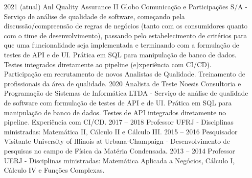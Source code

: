 \documentclass[9pt]{developercv} %
\begin{document}
\begin{entrylist}
	\entry
	{2021 (atual)}%
	{Anl Quality Assurance II}
	{Globo Comunicação e Participações S/A}
	{- Serviço de análise de qualidade de software, começando pela discussão/compreensão de regras de negócios (tanto com os consumidores quanto com o time de desenvolvimento), passando pelo estabelecimento de critérios para que uma funcionalidade seja implementada e terminando com a formulação de testes de API e de UI. Prática em SQL para manipulação de banco de dados. Testes integrados diretamente ao pipeline (e)xperiência com CI/CD). Participação em recrutamento de novos Analistas de Qualidade. Treinamento de profissionais da área de qualidade.}
	\entry
	{2020}%
	{Analista de Teste}
	{Noesis Consultoria e Programação de Sistemas de Informática LTDA}
	{- Serviço de análise de qualidade de software com formulação de testes de API e de UI. Prática em SQL para manipulação de banco de dados. Testes de API integrados diretamente no pipeline. Experiência com CI/CD.}
	\entry
	{2017 -- 2018}
	{Professor}
	{UFRJ}
	{- Disciplinas ministradas: Matemática II, C\'alculo II e C\'alculo III.}
	\entry
	{2015 -- 2016}
	{Pesquisador Visitante}
	{University of Illinois at Urbana-Champaign}
	{- Desenvolvimento de pesquisas no campo de F\'isica da Mat\'eria Condensada.}
	\entry
	{2013 -- 2014}
	{Professor}
	{UERJ}
	{- Disciplinas ministradas: Matemática Aplicada a Negócios, C\'alculo I, C\'alculo IV e Funções Complexas.}
\end{entrylist}

\end{document}
